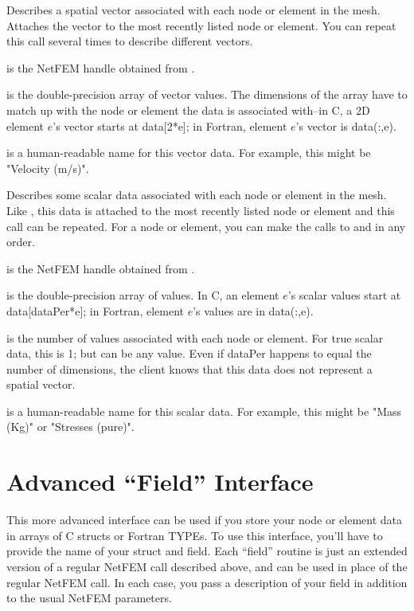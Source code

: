 \documentclass[10pt]{article}
\begin{document}
Describes a spatial vector associated with each node or element
in the mesh.  Attaches the vector to the most recently listed 
node or element.  You can repeat this call several times to 
describe different vectors.

 is the NetFEM handle obtained from .

 is the double-precision array of vector values.
The dimensions of the array have to match up with the node
or element the data is associated with--in C, a 2D element $e$'s
vector starts at data[2*e]; in Fortran, element $e$'s 
vector is data(:,e).

 is a human-readable name for this vector data.
For example, this might be "Velocity (m/s)".



Describes some scalar data associated with each node or element
in the mesh.  Like , this data is attached 
to the most recently listed node or element and this call 
can be repeated.  For a node or element, you can make the 
calls to  and  in any order.

 is the NetFEM handle obtained from .

 is the double-precision array of values.
In C, an element $e$'s scalar values start at data[dataPer*e];
in Fortran, element $e$'s values are in data(:,e).

 is the number of values associated with each 
node or element.  For true scalar data, this is 1; but 
can be any value.  Even if dataPer happens to equal the number
of dimensions, the client knows that this data does not 
represent a spatial vector.

 is a human-readable name for this scalar data.
For example, this might be "Mass (Kg)" or "Stresses (pure)".



\section{Advanced ``Field'' Interface}
This more advanced interface can be used if you 
store your node or element data in arrays of C structs or 
Fortran TYPEs.  To use this interface, you'll have to
provide the name of your struct and field.  Each
``field'' routine is just an extended version of 
a regular NetFEM call described above, and can be 
used in place of the regular NetFEM call.
In each case, you pass a description of your field
in addition to the usual NetFEM parameters.
\end{document}
